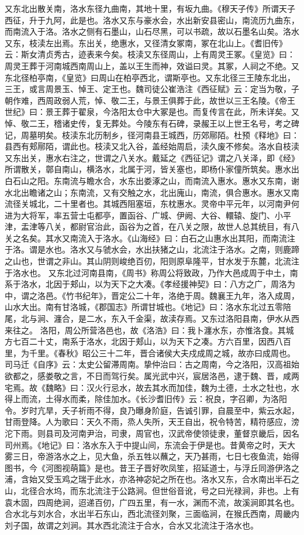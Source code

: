 \documentclass[12pt,UTF8]{ctexbook}
\begin{document}
又东北出散关南，洛水东径九曲南，其地十里，有坂九曲。《穆天子传》所谓天子西征，升于九阿，此是也。洛水又东与豪水会，水出新安县密山，南流历九曲东，而南流入于洛。洛水之侧有石墨山，山石尽黑，可以书疏，故以石墨名山矣。洛水又东，枝渎左出焉。东出关，绝惠水，又径清女冢南，冢在北山上。《耆旧传》云：斯女清贞秀古，迹表来今矣。枝渎又东径周山，上有周灵王冢。《皇览》曰：周灵王葬于河南城西南周山上，盖以王生而神，效谥曰灵。其冢，人祠之不绝。又东北径柏亭南，《皇览》曰周山在柏亭西北，谓斯亭也。又东北径三王陵东北出，三王，或言周景玉、悼王、定王也。魏司徒公崔浩注《西征赋》云：定当为敬，子朝作难，西周政弱人荒，悼、敬二王，与景王俱葬于此，故世以三王名陵。《帝王世纪》曰：景王葬于翟泉，今洛阳太仓中大冢是也。而复传言在此，所未详矣。又悼、敬二王，稽诸史传，复无葬处。今陵东有石碑，录赧王以上世王名号，考之碑记，周墓明矣。枝渎东北历制乡，径河南县王城西，历郊鄏陌。杜预《释地》曰：县西有郏鄏陌，谓此也。枝渎又北入谷，盖经始周启，渎久废不修矣。洛水自枝渎又东出关，惠水右注之，世谓之八关水。戴延之《西征记》谓之八关泽，即《经》所谓散关，鄣自南山，横洛水，北属于河，皆关塞也，即杨仆家僮所筑矣。惠水出白石山之阳。东南流与瞻水合，水东出娄涿之山，而南流入惠水。惠水又东南，谢水北出瞻诸之山；东南流，又有交触之水，北出廆山，南流，俱合惠水。惠水又南流径关城北，二十里者也。其城西阻塞垣，东枕惠水。灵帝中平元年，以河南尹何进为大将军，率五营士屯都亭，置函谷、广城、伊阙、大谷、轘辕、旋门、小平津，盂津等八关，都尉官治此，函谷为之首，在八关之限，故世人总其统目，有八关之名矣。其水又南流入于洛水。《山海经》曰：白石之山惠水出其阳，而南流注于洛。谓是水也。洛水又与虢水会，水出扶猪之山，北流注于洛水。之南，则鹿蹄之山也，世谓之非山。其山阴则峻绝百仞，阳则原阜隆平，甘水发于东麓，北流注于洛水也。
又东北过河南县南，《周书》称周公将致政，乃作大邑成周于中土，南系于洛水，北因于郏山，以为天下之大凑。《孝经援神契》曰：八方之广，周洛为中，谓之洛邑。《竹书纪年》，晋定公二十年，洛绝于周。魏襄王九年，洛入成周，山水大出。南有甘洛城，《郡国志》所谓甘城也。《地记》曰：洛水东北过五零陪尾，北与涧、瀍合，是二水，东入千金渠，故渎存焉。又东过洛阳县南，伊水从西来往之。
洛阳，周公所营洛邑也，故《洛浩》曰：我卜瀍水东，亦惟洛食。其城方七百二十丈，南系于洛水，北因于郏山，以为天下之凑。方六百里，因西八百里，为千里。《春秋》昭公三十二年，晋合诸侯大夫戍成周之城，故亦曰成周也。司马迁《自序》云：太史公留滞周南。挚仲治曰：古之周南，今之洛阳，汉高祖始欲都之，感娄敬之言，不日而驾行矣。属光武中兴，宸居洛邑，逮于魏、晋，咸两宅焉。故《魏略》曰：汉火行忌水，故去其水而加佳，魏为土德，土水之牡也，水得上而流，土得水而柔，除佳加水。《长沙耆旧传》云：祝良，字召卿，为洛阳令。岁时亢旱，夭子祈雨不得，良乃曝身阶庭，告诚引罪，自晨至中，紫云水起，甘雨登降。人为歌曰：天久不雨，烝人失所，天王自出，祝令特苦，精符感应，滂沱下雨。则县司及河南尹治，司隶，周官也，汉武帝使领徒隶，董督京畿后，因名司州焉。《地记》曰：洛水东入于中提山间，东流会于伊是也。昔黄帝之时，天大雾三日，帝游洛水之上，见大鱼，杀五牲以蘸之，天乃甚雨，七日七夜鱼流，始得图书，今《河图视萌篇》是也。昔王子晋好吹凤笙，招延道士，与浮丘同游伊洛之浦，含始又受玉鸡之瑞于此水，亦洛神宓妃之所在也。洛水又东，合水南出半石之山，北径合水坞，而东北流注于公路涧。但世俗音讹，号之曰光禄涧，非也。上有袁木固，四周绝涧，迢递百仞，广四五里，有一水，渊而不流，故溪涧即其名也。合水北与刘水合，水出半石东山，西北流径刘聚，三面临涧，在猴氏西南，周畿内刘子国，故谓之刘涧。其水西北流注于合水，合水又北流注于洛水也。
\end{document}
